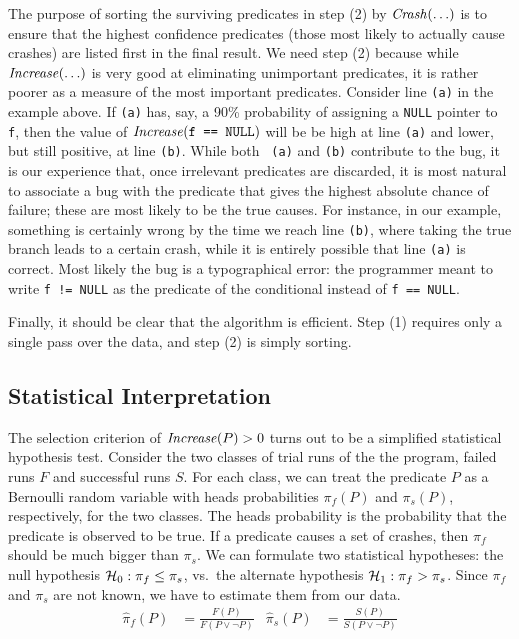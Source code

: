 The purpose of sorting the surviving predicates in step (2) by
$\mbox{\textit{Crash}}(\ldots)$ is to ensure that the highest confidence predicates (those
most likely to actually cause crashes) are listed first in the final
result.  We need step (2) because while $\mbox{\textit{Increase}}(\ldots)$ is very good at
eliminating unimportant predicates, it is rather poorer as a measure
of the most important predicates.  Consider line {\tt (a)} in the
example above.  If {\tt (a)} has, say, a 90\% probability of assigning
a {\tt NULL} pointer to {\tt f}, then the value of
$\mbox{\textit{Increase}}(\mbox{\tt f == NULL})$ will be be high at line {\tt (a)}
and lower, but still positive, at line {\tt (b)}.  While both {\tt
(a)} and {\tt (b)} contribute to the bug, it is our experience that,
once irrelevant predicates are discarded, it is most natural to
associate a bug with the predicate that gives the highest absolute
chance of failure; these are most likely to be the true causes.  For
instance, in our example, something is certainly wrong by the time we
reach line {\tt (b)}, where taking the true branch leads to a certain
crash, while it is entirely possible that line {\tt (a)} is correct.
Most likely the bug is a typographical error: the programmer meant to
write {\tt f != NULL} as the predicate of the conditional instead of
{\tt f == NULL}.

Finally, it should be clear that the algorithm is efficient.
Step (1) requires only a single pass over the data, and step (2) is
simply sorting.

\subsection{Statistical Interpretation}

The selection criterion of $\mbox{\textit{Increase}}(P) > 0$ turns out to be a simplified
statistical hypothesis test.  Consider the two classes of trial runs
of the the program, failed runs $F$ and successful runs $S$.  For each
class, we can treat the predicate $P$ as a Bernoulli random variable
with heads probabilities $\pi_f(P)$ and $\pi_s(P)$, respectively, for the
two classes.  The heads
probability is the probability that the predicate is observed to be
true.  If a predicate causes a set of crashes, then $\pi_f$ should be
much bigger than $\pi_s$.  We can formulate two statistical hypotheses:
the null hypothesis ${\mathcal{H}}_0:
\pi_f \leq \pi_s$, vs.\ the alternate hypothesis ${\mathcal{H}}_1: \pi_f > \pi_s$.  Since
$\pi_f$ and $\pi_s$ are not known, we have to estimate them from our
data.
\begin{align*}
  \hat \pi_f(P) &= \frac{F(P)}{F(P \lor \lnot P)} &
  \hat \pi_s(P) &= \frac{S(P)}{S(P \lor \lnot P)}
\end{align*}


